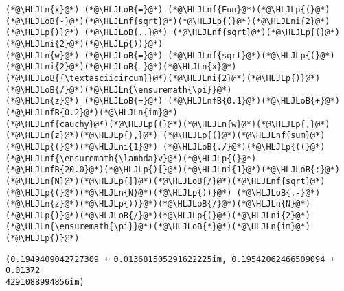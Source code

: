 \documentclass[12pt,a4paper]{article}
\newcommand{\HLJLn}[1]{#1}
\newcommand{\HLJLnf}[1]{\textcolor[RGB]{66,102,213}{#1}}
\newcommand{\HLJLnfB}[1]{\textcolor[RGB]{59,151,46}{#1}}
\newcommand{\HLJLni}[1]{\textcolor[RGB]{59,151,46}{#1}}
\newcommand{\HLJLoB}[1]{\textcolor[RGB]{102,102,102}{\textbf{#1}}}
\newcommand{\HLJLp}[1]{#1}
\begin{document}
\begin{lstlisting}
(*@\HLJLn{x}@*) (*@\HLJLoB{=}@*) (*@\HLJLnf{Fun}@*)(*@\HLJLp{(}@*)(*@\HLJLoB{-}@*)(*@\HLJLnf{sqrt}@*)(*@\HLJLp{(}@*)(*@\HLJLni{2}@*)(*@\HLJLp{)}@*) (*@\HLJLoB{..}@*) (*@\HLJLnf{sqrt}@*)(*@\HLJLp{(}@*)(*@\HLJLni{2}@*)(*@\HLJLp{))}@*)
(*@\HLJLn{w}@*) (*@\HLJLoB{=}@*) (*@\HLJLnf{sqrt}@*)(*@\HLJLp{(}@*)(*@\HLJLni{2}@*)(*@\HLJLoB{-}@*)(*@\HLJLn{x}@*)(*@\HLJLoB{{\textasciicircum}}@*)(*@\HLJLni{2}@*)(*@\HLJLp{)}@*)(*@\HLJLoB{/}@*)(*@\HLJLn{\ensuremath{\pi}}@*)
(*@\HLJLn{z}@*) (*@\HLJLoB{=}@*) (*@\HLJLnfB{0.1}@*)(*@\HLJLoB{+}@*)(*@\HLJLnfB{0.2}@*)(*@\HLJLn{im}@*)
(*@\HLJLnf{cauchy}@*)(*@\HLJLp{(}@*)(*@\HLJLn{w}@*)(*@\HLJLp{,}@*) (*@\HLJLn{z}@*)(*@\HLJLp{),}@*) (*@\HLJLp{(}@*)(*@\HLJLnf{sum}@*)(*@\HLJLp{(}@*)(*@\HLJLni{1}@*) (*@\HLJLoB{./}@*)(*@\HLJLp{((}@*)(*@\HLJLnf{\ensuremath{\lambda}v}@*)(*@\HLJLp{(}@*)(*@\HLJLnfB{20.0}@*)(*@\HLJLp{)[}@*)(*@\HLJLni{1}@*)(*@\HLJLoB{:}@*)(*@\HLJLn{N}@*)(*@\HLJLp{]}@*)(*@\HLJLoB{/}@*)(*@\HLJLnf{sqrt}@*)(*@\HLJLp{(}@*)(*@\HLJLn{N}@*)(*@\HLJLp{))}@*) (*@\HLJLoB{.-}@*) (*@\HLJLn{z}@*)(*@\HLJLp{))}@*)(*@\HLJLoB{/}@*)(*@\HLJLn{N}@*)(*@\HLJLp{)}@*)(*@\HLJLoB{/}@*)(*@\HLJLp{(}@*)(*@\HLJLni{2}@*)(*@\HLJLn{\ensuremath{\pi}}@*)(*@\HLJLoB{*}@*)(*@\HLJLn{im}@*)(*@\HLJLp{)}@*)
\end{lstlisting}

\begin{lstlisting}
(0.1949409042727309 + 0.013681505291622225im, 0.19542062466509094 + 0.01372
4291088994856im)
\end{lstlisting}
\end{document}
